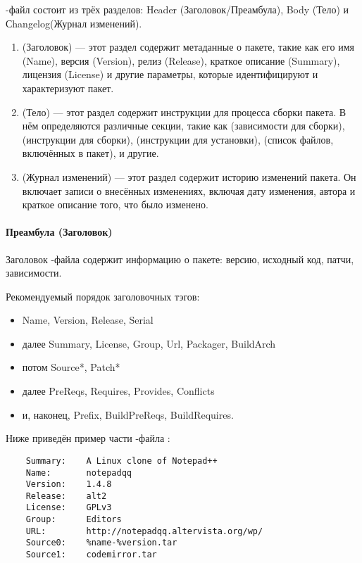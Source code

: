 -файл состоит из трёх разделов: Header (Заголовок/Преамбула), Body (Тело) и Сhangelog(Журнал изменений).
\begin{enumerate}
	\item {} (Заголовок) --- этот раздел содержит метаданные о пакете, такие как его имя (Name), 
		версия (Version), релиз (Release), краткое описание (Summary), лицензия (License) и другие 
		параметры, которые идентифицируют и характеризуют пакет.
	\item {} (Тело) --- этот раздел содержит инструкции для процесса сборки пакета. В нём 
		определяются различные секции, такие как  (зависимости для сборки), 
		 (инструкции для сборки),  (инструкции для установки), 
		 (список файлов, включённых в пакет), и другие.	
	\item {} (Журнал изменений) --- этот раздел содержит историю изменений пакета. 
		Он включает записи о внесённых изменениях, включая дату изменения, автора и краткое 
		описание того, что было изменено.
\end{enumerate}

\paragraph{Преамбула (Заголовок)}
Заголовок -файла содержит информацию о пакете: версию, исходный код, патчи, зависимости.

Рекомендуемый порядок заголовочных тэгов:
\begin{itemize}
	\item Name, Version, Release, Serial
	\item далее Summary, License, Group, Url, Packager, BuildArch
	\item потом Source*, Patch*
	\item далее PreReqs, Requires, Provides, Conflicts
	\item и, наконец, Prefix, BuildPreReqs, BuildRequires.
\end{itemize}

Ниже приведён пример части -файла :
\begin{verbatim}
	Summary:	A Linux clone of Notepad++
	Name:		notepadqq
	Version:	1.4.8
	Release:	alt2
	License:	GPLv3
	Group:		Editors
	URL:		http://notepadqq.altervista.org/wp/
	Source0:	%name-%version.tar
	Source1:	codemirror.tar
\end{verbatim}
